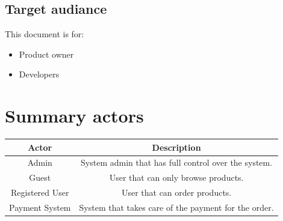 \documentclass[titlepage, a4paper, 12pt]{article}
\begin{document}
\subsection{Target audiance}
This document is for:
\begin{itemize}
	\item Product owner
	\item Developers
\end{itemize}

\newpage

\section{Summary actors}
\begin{table}[ht]
	\begin{tabular}{|c|c|}
		\hline
		Actor & Description\\
		\hline\hline
		Admin & System admin that has full control over the system.\\
		\hline
		Guest & User that can only browse products.\\
		\hline
		Registered User & User that can order products.\\
		\hline
		Payment System & System that takes care of the payment for the order.\\
		\hline
	\end{tabular}
\end{table}
\end{document}
